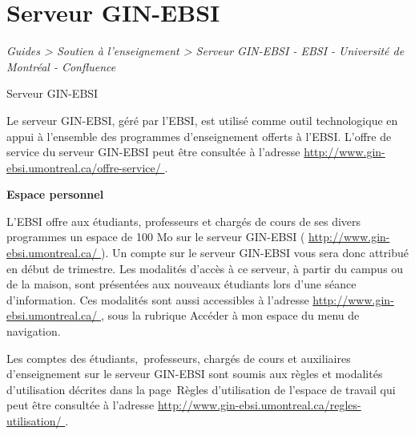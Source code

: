 \documentclass [12 pt]{article}
\begin{document}
    
    
        \newpage
        \section {
        Serveur GIN-EBSI
        }
        
        
        
        \textit{
        Guides > Soutien à l'enseignement > Serveur GIN-EBSI - EBSI - Université
            de Montréal - Confluence
        }
    
        Serveur GIN-EBSI
        
            Le serveur GIN-EBSI, géré par l'EBSI, est utilisé comme outil technologique en appui
                à l'ensemble des programmes d'enseignement offerts à l'EBSI.
            L'offre de service du serveur GIN-EBSI peut être consultée à l'adresse 
        \href{
        http://www.gin-ebsi.umontreal.ca/offre-service/
        } {
        http://www.gin-ebsi.umontreal.ca/offre-service/
        }
    .
            
        \textbf{
        Espace
                personnel
        }
    
            L'EBSI offre aux étudiants, professeurs et chargés de cours de ses divers programmes
                un espace de 100 Mo sur le serveur GIN-EBSI (
        \href{
        http://www.gin-ebsi.umontreal.ca/
        } {
        http://www.gin-ebsi.umontreal.ca/
        }
    ).
            Un compte sur le serveur GIN-EBSI vous sera donc attribué en début de trimestre. Les
                modalités d'accès à ce serveur, à partir du campus ou de la maison, sont présentées
                aux nouveaux étudiants lors d'une séance d'information. Ces modalités sont aussi
                accessibles à l'adresse 
        \href{
        http://www.gin-ebsi.umontreal.ca/
        } {
        http://www.gin-ebsi.umontreal.ca/
        }
    , sous
                la rubrique Accéder à mon espace du menu de navigation.
            
                Les comptes des étudiants, professeurs,
                    chargés de cours et auxiliaires d'enseignement sur le serveur GIN-EBSI sont
                    soumis aux règles et modalités d'utilisation décrites dans la
                        page Règles d'utilisation de l'espace de travail qui peut être
                    consultée à l’adresse 
        \href{
        http://www.gin-ebsi.umontreal.ca/regles-utilisation/
        } {
        http://www.gin-ebsi.umontreal.ca/regles-utilisation/
        }
    .
            
\end{document}
